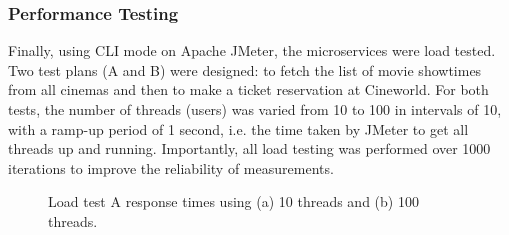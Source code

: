 \subsubsection{Performance Testing}

Finally, using CLI mode on Apache JMeter, the microservices were load tested. Two test plans (A and B) were designed: to fetch the list of movie showtimes from all cinemas and then to make a ticket reservation at Cineworld. For both tests, the number of threads (users) was varied from 10 to 100 in intervals of 10, with a ramp-up period of 1 second, i.e. the time taken by JMeter to get all threads up and running. Importantly, all load testing was performed over 1000 iterations to improve the reliability of measurements.

\begin{figure}[H]
  \centering
  \caption{Load test A response times using (a) 10 threads and (b) 100 threads.}
  \label{fig:cs01-lta-12}
\end{figure}


